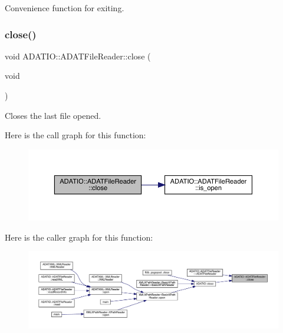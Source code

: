 Convenience function for exiting. 

\mbox{\label{group__qio_ga8b86dba1600272d26539815146f04078}} 
\subsubsection{\texorpdfstring{close()}{close()}\hspace{0.1cm}{\footnotesize\ttfamily [1/2]}}
{\footnotesize\ttfamily void A\+D\+A\+T\+I\+O\+::\+A\+D\+A\+T\+File\+Reader\+::close (\begin{DoxyParamCaption}\item[{void}]{ }\end{DoxyParamCaption})}



Closes the last file opened. 

Here is the call graph for this function\+:\nopagebreak
\begin{figure}[H]
\begin{center}
\leavevmode
\includegraphics[width=350pt]{db/de5/group__qio_ga8b86dba1600272d26539815146f04078_cgraph}
\end{center}
\end{figure}
Here is the caller graph for this function\+:\nopagebreak
\begin{figure}[H]
\begin{center}
\leavevmode
\includegraphics[width=350pt]{db/de5/group__qio_ga8b86dba1600272d26539815146f04078_icgraph}
\end{center}
\end{figure}
\mbox{\label{group__qio_gac32c771b58d87e4ef4af62a7ad2e5c0d}} 
